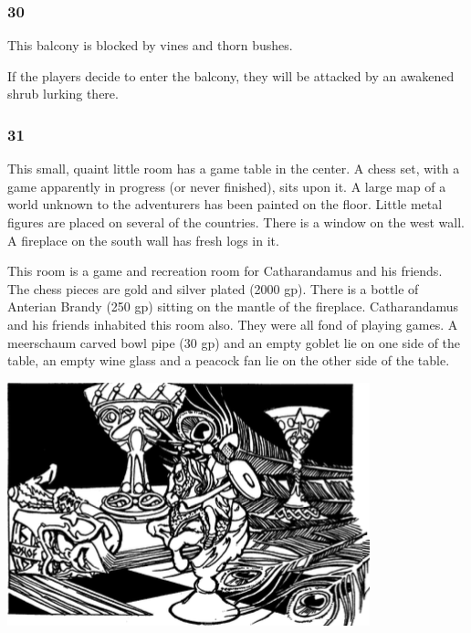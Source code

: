 \documentclass[palace_of_the_silver_princess]{subfiles}
\begin{document}
\subsubsection{30}
\begin{quotebox}
    This balcony is blocked by vines and thorn bushes.
\end{quotebox}

If the players decide to enter the balcony, they will be attacked by an
awakened shrub lurking there.

\subsubsection{31}
\begin{quotebox}
    This small, quaint little room has a game table in the center. A
    chess set, with a game apparently in progress (or never finished),
    sits upon it. A large map of a world unknown to the adventurers has
    been painted on the floor. Little metal figures are placed on
    several of the countries. There is a window on the west wall. A
    fireplace on the south wall has fresh logs in it.
\end{quotebox}

This room is a game and recreation room for Catharandamus and his
friends. The chess pieces are gold and silver plated (2000 gp). There is
a bottle of Anterian Brandy (250 gp) sitting on the mantle of the
fireplace. Catharandamus and his friends inhabited this room also. They
were all fond of playing games. A meerschaum carved bowl pipe (30 gp)
and an empty goblet lie on one side of the table, an empty wine glass
and a peacock fan lie on the other side of the table.

\includegraphics[width=\columnwidth]{img/goblet.png}
\end{document}
